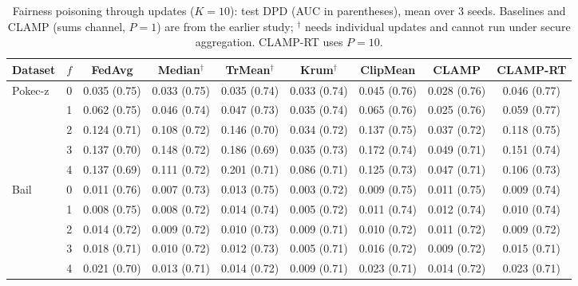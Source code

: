\begin{table}[tbp]
\centering
\scriptsize
\setlength{\tabcolsep}{3pt}
\caption{Fairness poisoning through updates ($K=10$): test DPD (AUC in parentheses), mean over 3 seeds. Baselines and CLAMP (sums channel, $P=1$) are from the earlier study; $^\dagger$ needs individual updates and cannot run under secure aggregation. CLAMP-RT uses $P=10$.}
\label{tab:e3}
\begin{adjustbox}{max width=\textwidth}
\begin{tabular}{lcccccccc}
\toprule
Dataset & $f$ & FedAvg & Median$^\dagger$ & TrMean$^\dagger$ & Krum$^\dagger$ & ClipMean & CLAMP & CLAMP-RT \\
\midrule
Pokec-z & 0 & 0.035 (0.75) & 0.033 (0.75) & 0.035 (0.74) & 0.033 (0.74) & 0.045 (0.76) & 0.028 (0.76) & 0.046 (0.77) \\
 & 1 & 0.062 (0.75) & 0.046 (0.74) & 0.047 (0.73) & 0.035 (0.74) & 0.065 (0.76) & 0.025 (0.76) & 0.059 (0.77) \\
 & 2 & 0.124 (0.71) & 0.108 (0.72) & 0.146 (0.70) & 0.034 (0.72) & 0.137 (0.75) & 0.037 (0.72) & 0.118 (0.75) \\
 & 3 & 0.137 (0.70) & 0.148 (0.72) & 0.186 (0.69) & 0.035 (0.73) & 0.172 (0.74) & 0.049 (0.71) & 0.151 (0.74) \\
 & 4 & 0.137 (0.69) & 0.111 (0.72) & 0.201 (0.71) & 0.086 (0.71) & 0.125 (0.73) & 0.047 (0.71) & 0.106 (0.73) \\
\midrule
Bail & 0 & 0.011 (0.76) & 0.007 (0.73) & 0.013 (0.75) & 0.003 (0.72) & 0.009 (0.75) & 0.011 (0.75) & 0.009 (0.74) \\
 & 1 & 0.008 (0.75) & 0.008 (0.72) & 0.014 (0.74) & 0.005 (0.72) & 0.011 (0.74) & 0.012 (0.74) & 0.010 (0.74) \\
 & 2 & 0.014 (0.72) & 0.009 (0.72) & 0.010 (0.73) & 0.009 (0.71) & 0.010 (0.72) & 0.011 (0.72) & 0.009 (0.72) \\
 & 3 & 0.018 (0.71) & 0.010 (0.72) & 0.012 (0.73) & 0.005 (0.71) & 0.016 (0.72) & 0.009 (0.72) & 0.015 (0.71) \\
 & 4 & 0.021 (0.70) & 0.013 (0.71) & 0.014 (0.72) & 0.009 (0.71) & 0.023 (0.71) & 0.014 (0.72) & 0.023 (0.71) \\
\bottomrule
\end{tabular}
\end{adjustbox}
\end{table}
